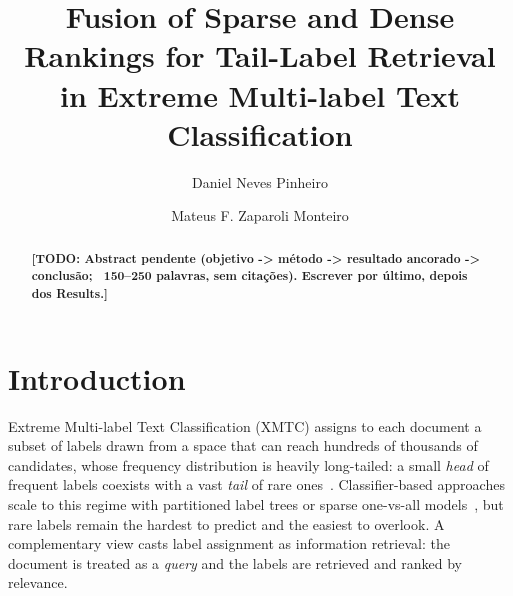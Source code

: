 \documentclass[sigconf,nonacm]{acmart}
\newcommand{\todo}[1]{\textbf{[TODO: #1]}}
\begin{document}
\title{Fusion of Sparse and Dense Rankings for Tail-Label Retrieval in
Extreme Multi-label Text Classification}

\author{Daniel Neves Pinheiro}
\email{} %

\author{Mateus F. Zaparoli Monteiro}
\email{} %

\begin{abstract}
\todo{Abstract pendente (objetivo -> método -> resultado ancorado -> conclusão;
~150--250 palavras, sem citações). Escrever por último, depois dos Results.}
\end{abstract}

\maketitle

\section{Introduction}

Extreme Multi-label Text Classification (XMTC) assigns to each document a subset of
labels drawn from a space that can reach hundreds of thousands of candidates, whose
frequency distribution is heavily long-tailed: a small \emph{head} of frequent labels
coexists with a vast \emph{tail} of rare ones~\cite{Jain2016PropensityXML, You2019AttentionXML}.
Classifier-based approaches scale to this regime with partitioned label trees or
sparse one-vs-all models~\cite{Prabhu2018Parabel, Babbar2017DiSMEC}, but rare labels
remain the hardest to predict and the easiest to overlook. A complementary view casts
label assignment as information retrieval: the document is treated as a \emph{query}
and the labels are retrieved and ranked by relevance.
\end{document}
